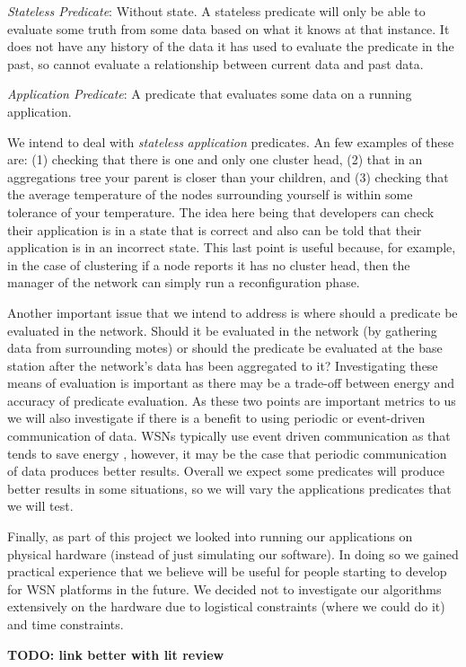 \begin{mydef}
\emph{Stateless Predicate}: Without state. A stateless predicate will only be able to evaluate some truth from some data based on what it knows at that instance. It does not have any history of the data it has used to evaluate the predicate in the past, so cannot evaluate a relationship between current data and past data.
\end{mydef}

\begin{mydef}
\emph{Application Predicate}: A predicate that evaluates some data on a running application.
\end{mydef}

We intend to deal with \emph{stateless} \emph{application} predicates. An few examples of these are: (1) checking that there is one and only one cluster head, (2) that in an aggregations tree your parent is closer than your children, and (3) checking that the average temperature of the nodes surrounding yourself is within some tolerance of your temperature. The idea here being that developers can check their application is in a state that is correct and also can be told that their application is in an incorrect state. This last point is useful because, for example, in the case of clustering if a node reports it has no cluster head, then the manager of the network can simply run a reconfiguration phase.

Another important issue that we intend to address is where should a predicate be evaluated in the network. Should it be evaluated in the network (by gathering data from surrounding motes) or should the predicate be evaluated at the base station after the network's data has been aggregated to it? Investigating these means of evaluation is important as there may be a trade-off between energy and accuracy of predicate evaluation. As these two points are important metrics to us we will also investigate if there is a benefit to using periodic or event-driven communication of data. WSNs typically use event driven communication \cite{?} as that tends to save energy \cite{?}, however, it may be the case that periodic communication of data produces better results. Overall we expect some predicates will produce better results in some situations, so we will vary the applications predicates that we will test.

Finally, as part of this project we looked into running our applications on physical hardware (instead of just simulating our software). In doing so we gained practical experience that we believe will be useful for people starting to develop for WSN platforms in the future. We decided not to investigate our algorithms extensively on the hardware due to logistical constraints (where we could do it) and time constraints.

\textbf{TODO: link better with lit review}




